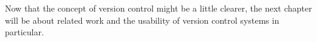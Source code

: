 Now that the concept of version control might be a little clearer, the next chapter will be about related work and the usability of version control systems in particular.





